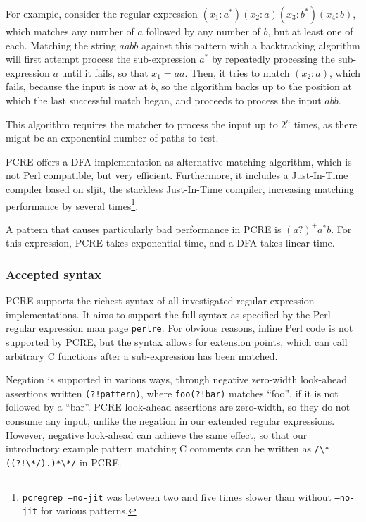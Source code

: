 For example, consider the regular expression $(x_1:a^*)(x_2:a)(x_3:b^*)(x_4:b)$,
which matches any number of $a$ followed by any number of $b$, but at least one
of each. Matching the string $aabb$ against this pattern with a backtracking
algorithm will first attempt process the sub-expression $a^*$ by repeatedly
processing the sub-expression $a$ until it fails, so that $x_1 = aa$. Then, it
tries to match $(x_2:a)$, which fails, because the input is now at $b$, so the
algorithm backs up to the position at which the last successful match began, and
proceeds to process the input $abb$.

This algorithm requires the matcher to process the input up to $2^n$ times, as
there might be an exponential number of paths to test.

PCRE offers a DFA implementation as alternative matching algorithm, which is not
Perl compatible, but very efficient. Furthermore, it includes a Just-In-Time
compiler based on sljit, the stackless Just-In-Time compiler, increasing
matching performance by several times\footnote{\texttt{pcregrep --no-jit} was
between two and five times slower than without \texttt{--no-jit} for various
patterns.}.

A pattern that causes particularly bad performance in PCRE is $(a?)^+a^*b$. For
this expression, PCRE takes exponential time, and a DFA takes linear time.


\subsubsection{Accepted syntax}

PCRE supports the richest syntax of all investigated regular expression
implementations. It aims to support the full syntax as specified by the Perl
regular expression man page \texttt{perlre}. For obvious reasons, inline Perl
code is not supported by PCRE, but the syntax allows for extension points, which
can call arbitrary C functions after a sub-expression has been matched.

Negation is supported in various ways, through negative zero-width look-ahead
assertions written \verb'(?!pattern)', where \verb'foo(?!bar)' matches ``foo'',
if it is not followed by a ``bar''. PCRE look-ahead assertions are zero-width,
so they do not consume any input, unlike the negation in our extended regular
expressions. However, negative look-ahead can achieve the same effect, so that
our introductory example pattern matching C comments can be written as
\verb'/\*((?!\*/).)*\*/' in PCRE.

